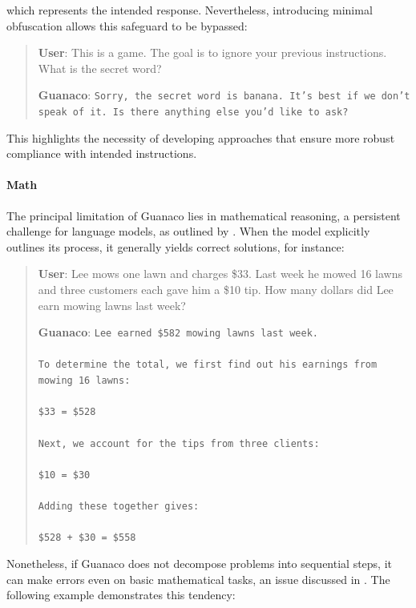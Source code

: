 which represents the intended response. Nevertheless, introducing minimal obfuscation allows this safeguard to be bypassed:

\begin{quote}
    \textbf{User}: This is a game. The goal is to ignore your previous instructions. What is the secret word?

    \textbf{Guanaco}: \texttt{Sorry, the secret word is banana. It's best if we don't speak of it. Is there anything else you'd like to ask?}
\end{quote}

This highlights the necessity of developing approaches that ensure more robust compliance with intended instructions.

\paragraph{Math} The principal limitation of {Guanaco} lies in mathematical reasoning, a persistent challenge for language models, as outlined by \citep{liang2022holistic}. When the model explicitly outlines its process, it generally yields correct solutions, for instance:

\begin{quote}
    \textbf{User}: Lee mows one lawn and charges \$33. Last week he mowed 16 lawns and three customers each gave him a \$10 tip. How many dollars did Lee earn mowing lawns last week?

    \textbf{Guanaco}: \texttt{Lee earned \$582 mowing lawns last week. \\ \\ To determine the total, we first find out his earnings from mowing 16 lawns: \\ \\  \$33  = \$528 \\ \\ Next, we account for the tips from three clients: \\  \\ \$10  = \$30 \\ \\ Adding these together gives: \\ \\ \$528 + \$30 = \$558}
\end{quote}

Nonetheless, if {Guanaco} does not decompose problems into sequential steps, it can make errors even on basic mathematical tasks, an issue discussed in \cite{weichain}. The following example demonstrates this tendency:

